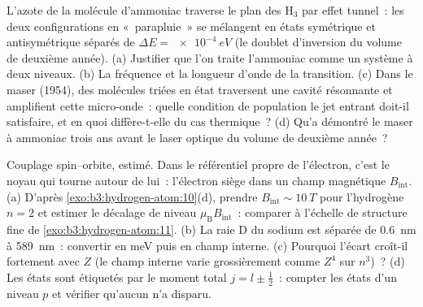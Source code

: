 \begin{exercise}[$\star\star$]\label{exo:b3:spin-two-level:9}
L'azote de la molécule d'ammoniac traverse le plan des H$_3$ par effet
tunnel~: les deux configurations en «~parapluie~» se mélangent en
états symétrique et antisymétrique séparés de
$\Delta E = \qty{e-4}{eV}$ (le doublet d'inversion du volume de
deuxième année). (a) Justifier que l'on traite l'ammoniac comme un
système à deux niveaux. (b) La fréquence et la longueur d'onde de la
transition. (c) Dans le maser (1954), des molécules triées en état
traversent une cavité résonnante et amplifient cette micro-onde~:
quelle condition de population le jet entrant doit-il satisfaire, et
en quoi diffère-t-elle du cas thermique~? (d) Qu'a démontré le maser à
ammoniac trois ans avant le laser optique du volume de deuxième année~?
\end{exercise}

\begin{exercise}[$\star\star\star$]\label{exo:b3:spin-two-level:10}
Couplage spin--orbite, estimé. Dans le référentiel propre de
l'électron, c'est le noyau qui tourne autour de lui~: l'électron
siège dans un champ magnétique $B_{\text
{int}}$. (a) D'après \cref{exo:b3:hydrogen-atom:10}(d), prendre
$B_{\text{int}} \sim \qty{10}{T}$ pour l'hydrogène $n = 2$ et estimer
le décalage de niveau $\mu_{\text{B}}B_{\text{int}}$~: comparer à
l'échelle de structure fine de \cref{exo:b3:hydrogen-atom:11}. (b) La
raie D du sodium est séparée de \qty{0.6}{nm} à \qty{589}{nm}~:
convertir en meV puis en champ interne. (c) Pourquoi l'écart
croît-il fortement avec $Z$ (le champ interne varie grossièrement
comme $Z^4$ sur $n^3$)~? (d) Les états sont étiquetés par le moment
total $j = l \pm \tfrac12$~: compter les états d'un niveau $p$ et
vérifier qu'aucun n'a disparu.
\end{exercise}

